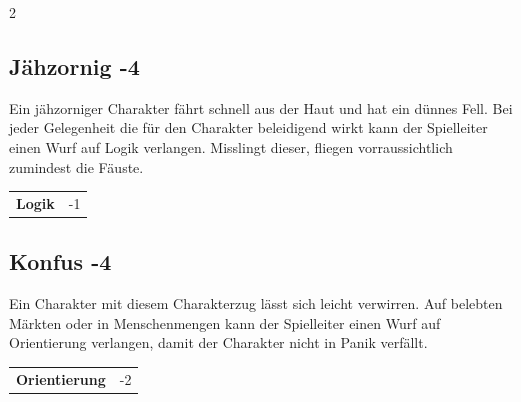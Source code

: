 \begin{multicols}{2}
\begin{tcolorbox}

\end{tcolorbox}

\begin{tcolorbox}
    \subsection*{Jähzornig \hfill \small{-4 }}
    \tcblower
Ein jähzorniger Charakter fährt schnell aus der Haut und hat ein dünnes Fell. Bei jeder Gelegenheit die für den Charakter beleidigend wirkt kann der Spielleiter einen Wurf auf Logik verlangen. Misslingt dieser, fliegen vorraussichtlich zumindest die Fäuste.


\vspace{3mm}

\begin{tabular}{@{}ll@{}}
    \textbf{Logik} & -1\\
\end{tabular}


\end{tcolorbox}

\begin{tcolorbox}
    \subsection*{Konfus \hfill \small{-4 }}
    \tcblower
Ein Charakter mit diesem Charakterzug lässt sich leicht verwirren. Auf belebten Märkten oder in Menschenmengen kann der Spielleiter einen Wurf auf Orientierung verlangen, damit der Charakter nicht in Panik verfällt.


\vspace{3mm}

\begin{tabular}{@{}ll@{}}
    \textbf{Orientierung} & -2\\
\end{tabular}


\end{tcolorbox}


\end{multicols}
